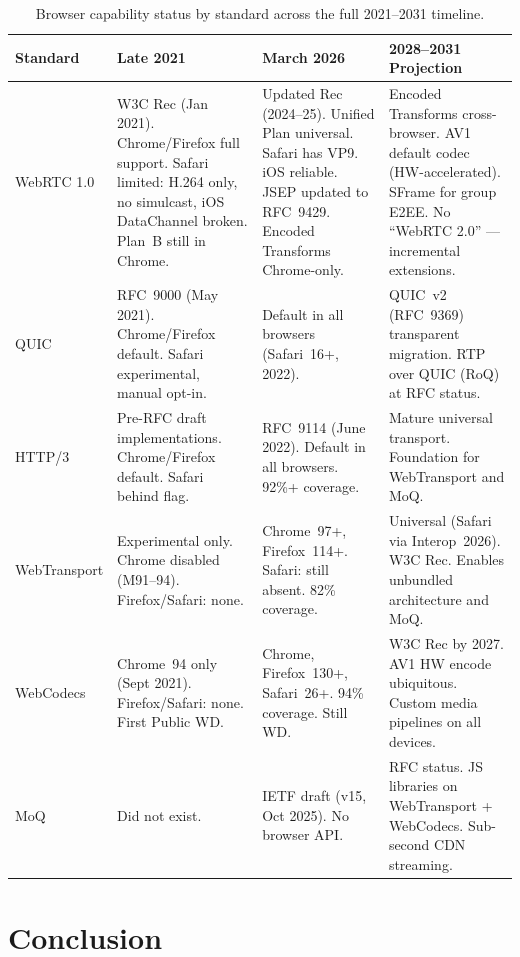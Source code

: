 \documentclass[11pt]{article}
\begin{document}
\begin{table}[ht]
\centering
\small
\renewcommand{\arraystretch}{1.3}
\begin{tabularx}{\textwidth}{lXXX}
\toprule
\textbf{Standard} & \textbf{Late 2021} & \textbf{March 2026} & \textbf{2028--2031 Projection} \\
\midrule
WebRTC 1.0 &
  W3C Rec (Jan 2021). Chrome/Firefox full support. Safari limited: H.264 only, no simulcast, iOS DataChannel broken. Plan~B still in Chrome. &
  Updated Rec (2024--25). Unified Plan universal. Safari has VP9. iOS reliable. JSEP updated to RFC~9429. Encoded Transforms Chrome-only. &
  Encoded Transforms cross-browser. AV1 default codec (HW-accelerated). SFrame for group E2EE. No ``WebRTC 2.0'' --- incremental extensions. \\
\midrule
QUIC &
  RFC~9000 (May 2021). Chrome/Firefox default. Safari experimental, manual opt-in. &
  Default in all browsers (Safari~16+, 2022). &
  QUIC~v2 (RFC~9369) transparent migration. RTP over QUIC (RoQ) at RFC status. \\
\midrule
HTTP/3 &
  Pre-RFC draft implementations. Chrome/Firefox default. Safari behind flag. &
  RFC~9114 (June 2022). Default in all browsers. 92\%+ coverage. &
  Mature universal transport. Foundation for WebTransport and MoQ. \\
\midrule
WebTransport &
  Experimental only. Chrome disabled (M91--94). Firefox/Safari: none. &
  Chrome~97+, Firefox~114+. Safari: still absent. 82\% coverage. &
  Universal (Safari via Interop~2026). W3C Rec. Enables unbundled architecture and MoQ. \\
\midrule
WebCodecs &
  Chrome~94 only (Sept 2021). Firefox/Safari: none. First Public WD. &
  Chrome, Firefox~130+, Safari~26+. 94\% coverage. Still WD. &
  W3C Rec by 2027. AV1 HW encode ubiquitous. Custom media pipelines on all devices. \\
\midrule
MoQ &
  Did not exist. &
  IETF draft (v15, Oct 2025). No browser API. &
  RFC status. JS libraries on WebTransport + WebCodecs. Sub-second CDN streaming. \\
\bottomrule
\end{tabularx}
\caption{Browser capability status by standard across the full 2021--2031 timeline.}
\label{tab:summary}
\end{table}

\section{Conclusion}
\end{document}
